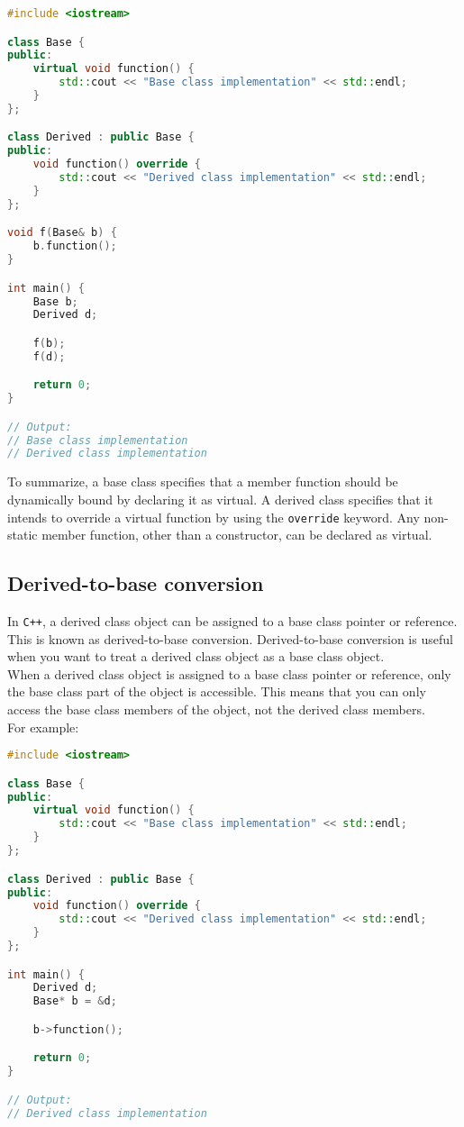 \begin{lstlisting}[language=C++]
#include <iostream>

class Base {
public:
    virtual void function() {
        std::cout << "Base class implementation" << std::endl;
    }
};

class Derived : public Base {
public:
    void function() override {
        std::cout << "Derived class implementation" << std::endl;
    }
};

void f(Base& b) {
    b.function();
}

int main() {
    Base b;
    Derived d;

    f(b);
    f(d);

    return 0;
}

// Output:
// Base class implementation
// Derived class implementation
\end{lstlisting}

To summarize, a base class specifies that a member function should be dynamically bound by
declaring it as virtual. A derived class specifies that it intends to override a virtual
function by using the \texttt{override} keyword. Any non-static member function, other than
a constructor, can be declared as virtual.

\subsection{Derived-to-base conversion}

In \texttt{C++}, a derived class object can be assigned to a base class pointer or reference.
This is known as derived-to-base conversion. Derived-to-base conversion is useful when you
want to treat a derived class object as a base class object.\\

When a derived class object is assigned to a base class pointer or reference, only the base
class part of the object is accessible. This means that you can only access the base class
members of the object, not the derived class members.\\

For example:\\

\begin{lstlisting}[language=C++]
#include <iostream>

class Base {
public:
    virtual void function() {
        std::cout << "Base class implementation" << std::endl;
    }
};

class Derived : public Base {
public:
    void function() override {
        std::cout << "Derived class implementation" << std::endl;
    }
};

int main() {
    Derived d;
    Base* b = &d;

    b->function();

    return 0;
}

// Output:
// Derived class implementation
\end{lstlisting}

